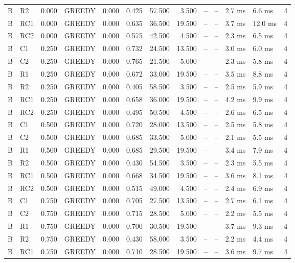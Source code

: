 \begin{table}
{\begin{tabular}{llrlrrrrrrllr}
B & R2 & 0.000 & GREEDY & 0.000 & 0.425 & 57.500 & 3.500 & -- & -- & 2.7 ms & 6.6 ms & 4 \\
B & RC1 & 0.000 & GREEDY & 0.000 & 0.635 & 36.500 & 19.500 & -- & -- & 3.7 ms & 12.0 ms & 4 \\
B & RC2 & 0.000 & GREEDY & 0.000 & 0.575 & 42.500 & 4.500 & -- & -- & 2.3 ms & 6.5 ms & 4 \\
B & C1 & 0.250 & GREEDY & 0.000 & 0.732 & 24.500 & 13.500 & -- & -- & 3.0 ms & 6.0 ms & 4 \\
B & C2 & 0.250 & GREEDY & 0.000 & 0.765 & 21.500 & 5.000 & -- & -- & 2.3 ms & 5.8 ms & 4 \\
B & R1 & 0.250 & GREEDY & 0.000 & 0.672 & 33.000 & 19.500 & -- & -- & 3.5 ms & 8.8 ms & 4 \\
B & R2 & 0.250 & GREEDY & 0.000 & 0.405 & 58.500 & 3.500 & -- & -- & 2.5 ms & 5.9 ms & 4 \\
B & RC1 & 0.250 & GREEDY & 0.000 & 0.658 & 36.000 & 19.500 & -- & -- & 4.2 ms & 9.9 ms & 4 \\
B & RC2 & 0.250 & GREEDY & 0.000 & 0.495 & 50.500 & 4.500 & -- & -- & 2.6 ms & 6.5 ms & 4 \\
B & C1 & 0.500 & GREEDY & 0.000 & 0.720 & 28.000 & 13.500 & -- & -- & 2.5 ms & 5.8 ms & 4 \\
B & C2 & 0.500 & GREEDY & 0.000 & 0.685 & 33.500 & 5.000 & -- & -- & 2.1 ms & 5.5 ms & 4 \\
B & R1 & 0.500 & GREEDY & 0.000 & 0.685 & 29.500 & 19.500 & -- & -- & 3.4 ms & 7.9 ms & 4 \\
B & R2 & 0.500 & GREEDY & 0.000 & 0.430 & 54.500 & 3.500 & -- & -- & 2.3 ms & 5.5 ms & 4 \\
B & RC1 & 0.500 & GREEDY & 0.000 & 0.668 & 34.500 & 19.500 & -- & -- & 3.6 ms & 8.1 ms & 4 \\
B & RC2 & 0.500 & GREEDY & 0.000 & 0.515 & 49.000 & 4.500 & -- & -- & 2.4 ms & 6.9 ms & 4 \\
B & C1 & 0.750 & GREEDY & 0.000 & 0.705 & 27.500 & 13.500 & -- & -- & 2.7 ms & 6.1 ms & 4 \\
B & C2 & 0.750 & GREEDY & 0.000 & 0.715 & 28.500 & 5.000 & -- & -- & 2.2 ms & 5.5 ms & 4 \\
B & R1 & 0.750 & GREEDY & 0.000 & 0.700 & 30.500 & 19.500 & -- & -- & 3.7 ms & 9.3 ms & 4 \\
B & R2 & 0.750 & GREEDY & 0.000 & 0.430 & 58.000 & 3.500 & -- & -- & 2.2 ms & 4.4 ms & 4 \\
B & RC1 & 0.750 & GREEDY & 0.000 & 0.710 & 28.500 & 19.500 & -- & -- & 3.6 ms & 9.7 ms & 4 \\

\end{tabular}}
\end{table}
